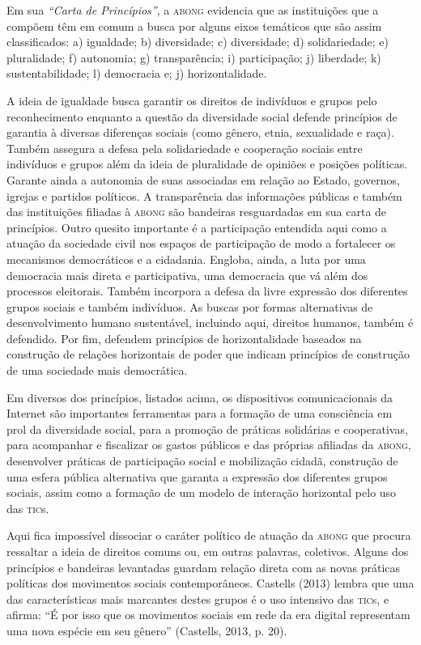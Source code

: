 Em sua \emph{``Carta de Princípios''}, a \textsc{abong} evidencia que as
instituições que a compõem têm em comum a busca por alguns eixos
temáticos que são assim classificados: a) igualdade; b) diversidade; c)
diversidade; d) solidariedade; e) pluralidade; f) autonomia; g)
transparência; i) participação; j) liberdade; k) sustentabilidade; l)
democracia e; j) horizontalidade.

A ideia de igualdade busca garantir os direitos de indivíduos e grupos
pelo reconhecimento enquanto a questão da diversidade social defende
princípios de garantia à diversas diferenças sociais (como gênero,
etnia, sexualidade e raça). Também assegura a defesa pela solidariedade
e cooperação sociais entre indivíduos e grupos além da ideia de
pluralidade de opiniões e posições políticas. Garante ainda a autonomia
de suas associadas em relação ao Estado, governos, igrejas e partidos
políticos. A transparência das informações públicas e também das
instituições filiadas à \textsc{abong} são bandeiras resguardadas em sua carta de
princípios. Outro quesito importante é a participação entendida aqui
como a atuação da sociedade civil nos espaços de participação de modo a
fortalecer os mecanismos democráticos e a cidadania. Engloba, ainda, a
luta por uma democracia mais direta e participativa, uma democracia que
vá além dos processos eleitorais. Também incorpora a defesa da livre
expressão dos diferentes grupos sociais e também indivíduos. As buscas
por formas alternativas de desenvolvimento humano sustentável, incluindo
aqui, direitos humanos, também é defendido. Por fim, defendem princípios
de horizontalidade baseados na construção de relações horizontais de
poder que indicam princípios de construção de uma sociedade mais
democrática.

Em diversos dos princípios, listados acima, os dispositivos
comunicacionais da Internet são importantes ferramentas para a formação
de uma consciência em prol da diversidade social, para a promoção de
práticas solidárias e cooperativas, para acompanhar e fiscalizar os
gastos públicos e das próprias afiliadas da \textsc{abong}, desenvolver práticas
de participação social e mobilização cidadã, construção de uma esfera
pública alternativa que garanta a expressão dos diferentes grupos
sociais, assim como a formação de um modelo de interação horizontal pelo
uso das \textsc{tic}s.

Aqui fica impossível dissociar o caráter político de atuação da \textsc{abong}
que procura ressaltar a ideia de direitos comuns ou, em outras palavras,
coletivos. Alguns dos princípios e bandeiras levantadas guardam relação
direta com as novas práticas políticas dos movimentos sociais
contemporâneos. Castells (2013) lembra que uma das características mais
marcantes destes grupos é o uso intensivo das \textsc{tic}s, e afirma: ``É por
isso que os movimentos sociais em rede da era digital representam uma
nova espécie em seu gênero'' (Castells, 2013, p. 20).

